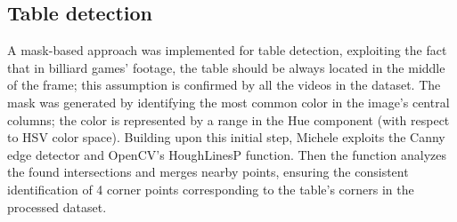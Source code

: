 \subsection{Table detection}

A mask-based approach was implemented for table detection, exploiting the fact that in billiard games' footage, the table should be always located in the middle of the frame; this assumption is confirmed by all the videos in the dataset.
The mask was generated by identifying the most common color in the image's central columns; the color is represented by a range in the Hue component (with respect to HSV color space).
Building upon this initial step, Michele exploits the Canny edge detector and OpenCV's HoughLinesP function.
Then the function analyzes the found intersections and merges nearby points, ensuring the consistent identification of 4 corner points corresponding to the table's corners in the processed dataset.
